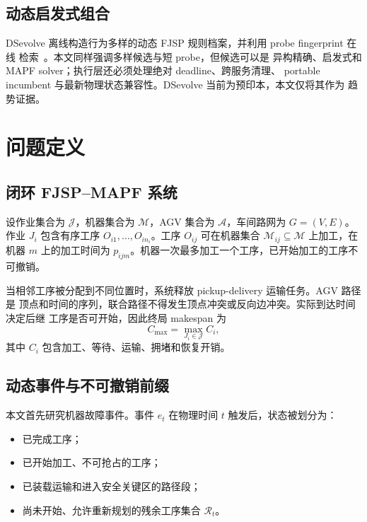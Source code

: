 \documentclass[11pt,a4paper]{article}
\newcommand{\cmax}{C_{\max}}
\begin{document}
\subsection{动态启发式组合}

DSevolve 离线构造行为多样的动态 FJSP 规则档案，并利用 probe fingerprint 在线
检索~\citep{huang2026dsevolve}。本文同样强调多样候选与短 probe，但候选可以是
异构精确、启发式和 MAPF solver；执行层还必须处理绝对 deadline、跨服务清理、
portable incumbent 与最新物理状态兼容性。DSevolve 当前为预印本，本文仅将其作为
趋势证据。

\section{问题定义}
\label{sec:problem}

\subsection{闭环 FJSP--MAPF 系统}

设作业集合为 \(\mathcal{J}\)，机器集合为 \(\mathcal{M}\)，AGV 集合为
\(\mathcal{A}\)，车间路网为 \(G=(V,E)\)。作业 \(J_i\) 包含有序工序
\(O_{i1},\ldots,O_{in_i}\)。工序 \(O_{ij}\) 可在机器集合
\(\mathcal{M}_{ij}\subseteq\mathcal{M}\) 上加工，在机器 \(m\) 上的加工时间为
\(p_{ijm}\)。机器一次最多加工一个工序，已开始加工的工序不可撤销。

当相邻工序被分配到不同位置时，系统释放 pickup-delivery 运输任务。AGV 路径是
顶点和时间的序列，联合路径不得发生顶点冲突或反向边冲突。实际到达时间决定后继
工序是否可开始，因此终局 makespan 为
\begin{equation}
    \cmax = \max_{J_i\in\mathcal{J}} C_i,
\end{equation}
其中 \(C_i\) 包含加工、等待、运输、拥堵和恢复开销。

\subsection{动态事件与不可撤销前缀}

本文首先研究机器故障事件。事件 \(e_t\) 在物理时间 \(t\) 触发后，状态被划分为：
\begin{itemize}
    \item 已完成工序；
    \item 已开始加工、不可抢占的工序；
    \item 已装载运输和进入安全关键区的路径段；
    \item 尚未开始、允许重新规划的残余工序集合 \(\mathcal{R}_t\)。
\end{itemize}
\end{document}
